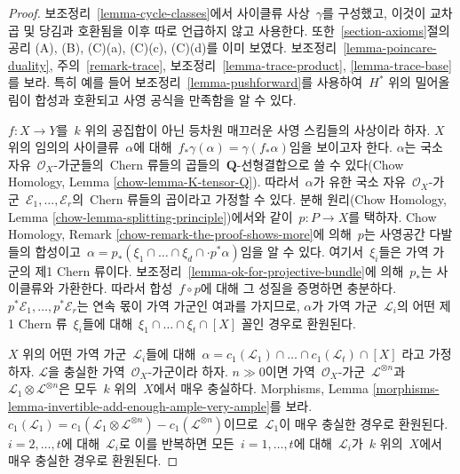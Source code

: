 \begin{proof}
보조정리\  \ref{lemma-cycle-classes}에서 사이클류 사상\  $\gamma$를
구성했고, 이것이 교차곱 및 당김과 호환됨을 이후 따로 언급하지 않고
사용한다. 또한\  \ref{section-axioms}절의 공리 (A), (B), (C)(a),
(C)(c), (C)(d)를 이미 보였다. 보조정리\ 
\ref{lemma-poincare-duality}, 주의\  \ref{remark-trace}, 보조정리\ 
\ref{lemma-trace-product}, \ref{lemma-trace-base}를 보라. 특히
예를 들어 보조정리\  \ref{lemma-pushforward}를 사용하여\  $H^*$ 위의
밀어올림이 합성과 호환되고 사영 공식을 만족함을 알 수 있다.

\medskip\noindent
$f : X \to Y$를\  $k$ 위의 공집합이 아닌 등차원 매끄러운 사영
스킴들의 사상이라 하자. $X$ 위의 임의의 사이클류\  $\alpha$에 대해\ 
$f_*\gamma(\alpha) = \gamma(f_*\alpha)$임을 보이고자 한다.
$\alpha$는 국소 자유\  $\mathcal{O}_X$-가군들의\  Chern 류들의 곱들의\ 
$\mathbf{Q}$-선형결합으로 쓸 수 있다(Chow Homology, Lemma
\ref{chow-lemma-K-tensor-Q}). 따라서\  $\alpha$가 유한 국소 자유\ 
$\mathcal{O}_X$-가군\  $\mathcal{E}_1, \ldots, \mathcal{E}_r$의\ 
Chern 류들의 곱이라고 가정할 수 있다. 분해 원리(Chow Homology,
Lemma \ref{chow-lemma-splitting-principle})에서와 같이\ 
$p : P \to X$를 택하자. Chow Homology, Remark
\ref{chow-remark-the-proof-shows-more}에 의해\  $p$는 사영공간
다발들의 합성이고\ 
$\alpha = p_*(\xi_1 \cap \ldots \cap \xi_d \cap \cdot p^*\alpha)$임을
알 수 있다. 여기서\  $\xi_i$들은 가역 가군의 제1 Chern 류이다.
보조정리\  \ref{lemma-ok-for-projective-bundle}에 의해\  $p_*$는
사이클류와 가환한다. 따라서 합성\  $f \circ p$에 대해 그 성질을
증명하면 충분하다. $p^*\mathcal{E}_1, \ldots, p^*\mathcal{E}_r$는
연속 몫이 가역 가군인 여과를 가지므로, $\alpha$가 가역 가군\ 
$\mathcal{L}_i$의 어떤 제1 Chern 류\  $\xi_i$들에 대해\ 
$\xi_1 \cap \ldots \cap \xi_t \cap [X]$ 꼴인 경우로 환원된다.

\medskip\noindent
$X$ 위의 어떤 가역 가군\  $\mathcal{L}_i$들에 대해\ 
$\alpha = c_1(\mathcal{L}_1) \cap \ldots \cap c_1(\mathcal{L}_t) \cap [X]$
라고 가정하자. $\mathcal{L}$을 충실한 가역\  $\mathcal{O}_X$-가군이라
하자. $n \gg 0$이면 가역\  $\mathcal{O}_X$-가군\ 
$\mathcal{L}^{\otimes n}$과\ 
$\mathcal{L}_1 \otimes \mathcal{L}^{\otimes n}$은 모두\  $k$ 위의\ 
$X$에서 매우 충실하다. Morphisms, Lemma
\ref{morphisms-lemma-invertible-add-enough-ample-very-ample}를 보라.
$c_1(\mathcal{L}_1) = c_1(\mathcal{L}_1 \otimes \mathcal{L}^{\otimes n})
- c_1(\mathcal{L}^{\otimes n})$이므로\  $\mathcal{L}_1$이 매우 충실한
경우로 환원된다. $i = 2, \ldots, t$에 대해\  $\mathcal{L}_i$로 이를
반복하면 모든\  $i = 1, \ldots, t$에 대해\  $\mathcal{L}_i$가\  $k$ 위의\ 
$X$에서 매우 충실한 경우로 환원된다.


\end{proof}
